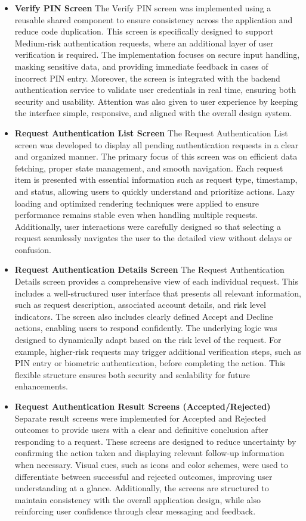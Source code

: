 \documentclass[12pt,oneside,openright,a4paper]{cpe-english-project}
\begin{document}
\begin{itemize}
\item
  \textbf{Verify PIN Screen}
The Verify PIN screen was implemented using a reusable shared component to ensure consistency across the application and reduce code duplication. This screen is specifically designed to support Medium-risk authentication requests, where an additional layer of user verification is required. The implementation focuses on secure input handling, masking sensitive data, and providing immediate feedback in cases of incorrect PIN entry. Moreover, the screen is integrated with the backend authentication service to validate user credentials in real time, ensuring both security and usability. Attention was also given to user experience by keeping the interface simple, responsive, and aligned with the overall design system.
\item
  \textbf{Request Authentication List Screen}
The Request Authentication List screen was developed to display all pending authentication requests in a clear and organized manner. The primary focus of this screen was on efficient data fetching, proper state management, and smooth navigation. Each request item is presented with essential information such as request type, timestamp, and status, allowing users to quickly understand and prioritize actions. Lazy loading and optimized rendering techniques were applied to ensure performance remains stable even when handling multiple requests. Additionally, user interactions were carefully designed so that selecting a request seamlessly navigates the user to the detailed view without delays or confusion.
\item
  \textbf{Request Authentication Details Screen}
The Request Authentication Details screen provides a comprehensive view of each individual request. This includes a well-structured user interface that presents all relevant information, such as request description, associated account details, and risk level indicators. The screen also includes clearly defined Accept and Decline actions, enabling users to respond confidently. The underlying logic was designed to dynamically adapt based on the risk level of the request. For example, higher-risk requests may trigger additional verification steps, such as PIN entry or biometric authentication, before completing the action. This flexible structure ensures both security and scalability for future enhancements.
\item
  \textbf{Request Authentication Result Screens (Accepted/Rejected)}
Separate result screens were implemented for Accepted and Rejected outcomes to provide users with a clear and definitive conclusion after responding to a request. These screens are designed to reduce uncertainty by confirming the action taken and displaying relevant follow-up information when necessary. Visual cues, such as icons and color schemes, were used to differentiate between successful and rejected outcomes, improving user understanding at a glance. Additionally, the screens are structured to maintain consistency with the overall application design, while also reinforcing user confidence through clear messaging and feedback.

\end{itemize}
\end{document}
